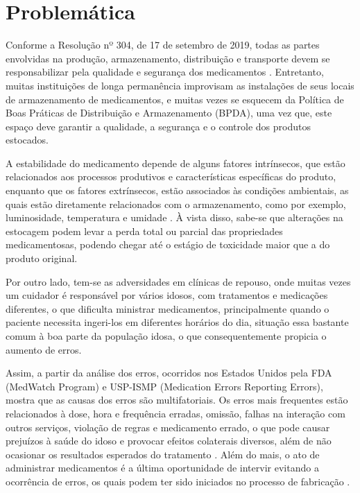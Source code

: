 \chapter[Problemática]{Problemática}

Conforme a Resolução nº 304, de 17 de setembro de 2019, todas as partes envolvidas na produção, armazenamento, distribuição e transporte devem se responsabilizar pela qualidade e segurança dos medicamentos \cite{RDC_304}. Entretanto, muitas instituições de longa permanência improvisam as instalações de seus locais de armazenamento de medicamentos,  e muitas vezes se esquecem da Política de Boas Práticas de Distribuição e Armazenamento (BPDA), uma vez que, este espaço deve garantir a qualidade, a segurança e o controle dos produtos estocados.

A estabilidade do medicamento depende de alguns fatores intrínsecos, que estão relacionados aos processos produtivos e características específicas do produto, enquanto que os fatores extrínsecos, estão associados às condições ambientais, as quais estão diretamente relacionados com o armazenamento, como por exemplo, luminosidade, temperatura e umidade \cite{Souza_2018}. À vista disso, sabe-se que alterações na estocagem podem levar a perda total ou parcial das propriedades medicamentosas, podendo chegar até o estágio de toxicidade maior que a do produto original.


Por outro lado, tem-se as adversidades em clínicas de repouso, onde muitas vezes um cuidador é responsável por vários idosos, com tratamentos e medicações diferentes, o que dificulta ministrar medicamentos, principalmente quando o paciente necessita ingeri-los em diferentes horários do dia, situação essa bastante comum à boa parte da população idosa, o que consequentemente propicia o aumento de erros.


Assim, a partir da análise dos erros, ocorridos nos Estados Unidos pela FDA (MedWatch Program) e USP-ISMP (Medication Errors Reporting Errors), mostra que as causas dos erros são multifatoriais. Os erros mais frequentes estão relacionados à dose, hora e frequência erradas, omissão, falhas na interação com outros serviços, violação de regras e medicamento errado, o que pode causar prejuízos à saúde do idoso e provocar efeitos colaterais diversos, além de não ocasionar os resultados esperados do tratamento \cite{Freire_2009}. Além do mais, o ato de administrar medicamentos é a última oportunidade de intervir evitando a ocorrência de erros, os quais podem ter sido iniciados no processo de fabricação \cite{Azevedo_2011}.

